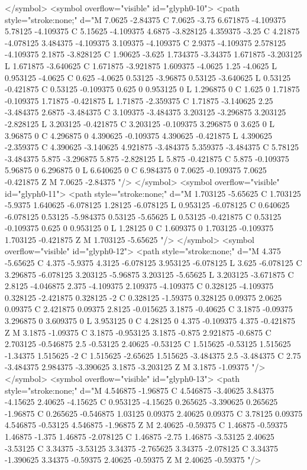 </symbol>
<symbol overflow="visible" id="glyph0-10">
<path style="stroke:none;" d="M 7.0625 -2.84375 C 7.0625 -3.75 6.671875 -4.109375 5.78125 -4.109375 C 5.15625 -4.109375 4.6875 -3.828125 4.359375 -3.25 C 4.21875 -4.078125 3.484375 -4.109375 3.109375 -4.109375 C 2.9375 -4.109375 2.578125 -4.109375 2.1875 -3.828125 C 1.90625 -3.625 1.734375 -3.34375 1.671875 -3.203125 L 1.671875 -3.640625 C 1.671875 -3.921875 1.609375 -4.0625 1.25 -4.0625 L 0.953125 -4.0625 C 0.625 -4.0625 0.53125 -3.96875 0.53125 -3.640625 L 0.53125 -0.421875 C 0.53125 -0.109375 0.625 0 0.953125 0 L 1.296875 0 C 1.625 0 1.71875 -0.109375 1.71875 -0.421875 L 1.71875 -2.359375 C 1.71875 -3.140625 2.25 -3.484375 2.6875 -3.484375 C 3.109375 -3.484375 3.203125 -3.296875 3.203125 -2.828125 L 3.203125 -0.421875 C 3.203125 -0.109375 3.296875 0 3.625 0 L 3.96875 0 C 4.296875 0 4.390625 -0.109375 4.390625 -0.421875 L 4.390625 -2.359375 C 4.390625 -3.140625 4.921875 -3.484375 5.359375 -3.484375 C 5.78125 -3.484375 5.875 -3.296875 5.875 -2.828125 L 5.875 -0.421875 C 5.875 -0.109375 5.96875 0 6.296875 0 L 6.640625 0 C 6.984375 0 7.0625 -0.109375 7.0625 -0.421875 Z M 7.0625 -2.84375 "/>
</symbol>
<symbol overflow="visible" id="glyph0-11">
<path style="stroke:none;" d="M 1.703125 -5.65625 C 1.703125 -5.9375 1.640625 -6.078125 1.28125 -6.078125 L 0.953125 -6.078125 C 0.640625 -6.078125 0.53125 -5.984375 0.53125 -5.65625 L 0.53125 -0.421875 C 0.53125 -0.109375 0.625 0 0.953125 0 L 1.28125 0 C 1.609375 0 1.703125 -0.109375 1.703125 -0.421875 Z M 1.703125 -5.65625 "/>
</symbol>
<symbol overflow="visible" id="glyph0-12">
<path style="stroke:none;" d="M 4.375 -5.65625 C 4.375 -5.9375 4.3125 -6.078125 3.953125 -6.078125 L 3.625 -6.078125 C 3.296875 -6.078125 3.203125 -5.96875 3.203125 -5.65625 L 3.203125 -3.671875 C 2.8125 -4.046875 2.375 -4.109375 2.109375 -4.109375 C 0.328125 -4.109375 0.328125 -2.421875 0.328125 -2 C 0.328125 -1.59375 0.328125 0.09375 2.0625 0.09375 C 2.421875 0.09375 2.8125 -0.015625 3.1875 -0.40625 C 3.1875 -0.09375 3.296875 0 3.609375 0 L 3.953125 0 C 4.28125 0 4.375 -0.109375 4.375 -0.421875 Z M 3.1875 -1.09375 C 3.1875 -0.953125 3.1875 -0.875 2.921875 -0.6875 C 2.703125 -0.546875 2.5 -0.53125 2.40625 -0.53125 C 1.515625 -0.53125 1.515625 -1.34375 1.515625 -2 C 1.515625 -2.65625 1.515625 -3.484375 2.5 -3.484375 C 2.75 -3.484375 2.984375 -3.390625 3.1875 -3.203125 Z M 3.1875 -1.09375 "/>
</symbol>
<symbol overflow="visible" id="glyph0-13">
<path style="stroke:none;" d="M 4.546875 -1.96875 C 4.546875 -3.40625 3.84375 -4.15625 2.40625 -4.15625 C 0.953125 -4.15625 0.265625 -3.390625 0.265625 -1.96875 C 0.265625 -0.546875 1.03125 0.09375 2.40625 0.09375 C 3.78125 0.09375 4.546875 -0.53125 4.546875 -1.96875 Z M 2.40625 -0.59375 C 1.46875 -0.59375 1.46875 -1.375 1.46875 -2.078125 C 1.46875 -2.75 1.46875 -3.53125 2.40625 -3.53125 C 3.34375 -3.53125 3.34375 -2.765625 3.34375 -2.078125 C 3.34375 -1.390625 3.34375 -0.59375 2.40625 -0.59375 Z M 2.40625 -0.59375 "/>
